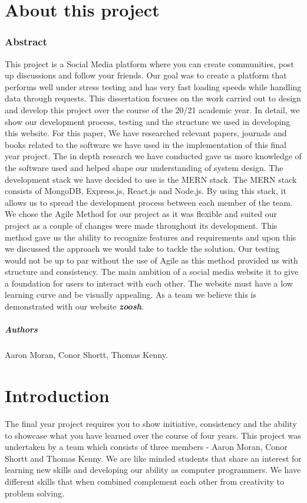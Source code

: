 
\chapter*{About this project}
\subsection{Abstract}
This project is a Social Media platform where you can create communities, post up discussions and follow your friends. Our goal was to create a platform that performs well under stress testing and has very fast loading speeds while handling data through requests.
This dissertation focuses on the work carried out to design and develop this project over the course of the 20/21 academic year. In detail, we show our development process, testing and the structure we used in developing this website. For this paper, We have researched relevant papers, journals and books related to the software we have used in the implementation of this final year project. The in depth research we have conducted gave us more knowledge of the software used and helped shape our understanding of system design. The development stack we have decided to use is the MERN stack. The MERN stack consists of MongoDB, Express.js, React.js and Node.js. By using this stack, it allows us to spread the development process between each member of the team. We chose the Agile Method for our project as it was flexible and suited our project as a couple of changes were made throughout its development. This method gave us the ability to recognize features and requirements and upon this we discussed the approach we would take to tackle the solution. Our testing would not be up to par without the use of Agile as this method provided us with structure and consistency. 
The main ambition of a social media website it to give a foundation for users to interact with each other. The website must have a low learning curve and be visually appealing. As a team we believe this is demonstrated with our website \textbf{\textit{zoosh}}.

\paragraph{Authors}
Aaron Moran, Conor Shortt, Thomas Kenny.

\chapter{Introduction}
The final year project requires you to show initiative, consistency and the ability to showcase what you have learned over the course of four years.
This project was undertaken by a team which consists of three members - Aaron Moran, Conor Shortt and Thomas Kenny. We are like minded students that share an interest for learning new skills and developing our ability as computer programmers. We have different skills that when combined complement each other from creativity to problem solving. 
\newline

